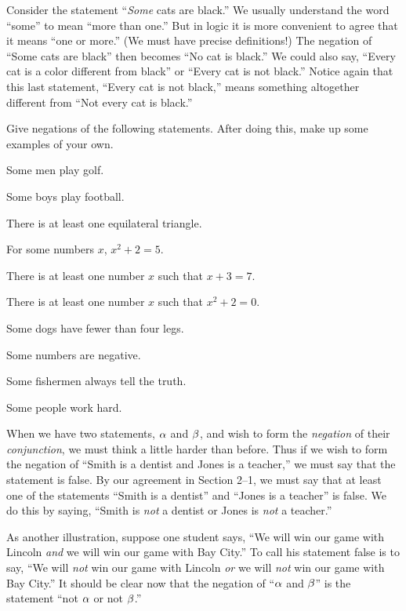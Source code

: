 \documentclass[11pt]{book}
\begin{document}
Consider the statement ``\emph{Some} cats are black.'' We usually understand the
word ``some'' to mean ``more than one.'' But in logic it is more convenient to
agree that it means ``one or more.'' (We must have precise definitions!) The
negation of ``Some cats are black'' then becomes ``No cat is black.'' We could
also say, ``Every cat is a color different from black'' or ``Every cat is not
black.'' Notice again that this last statement, ``Every cat is not black,'' means
something altogether different from ``Not every cat is black.''


Give negations of the following statements. After doing this, make up some
examples of your own.

\begin{exercisecols}
\begin{exlist}
\item Some men play golf.
\item Some boys play football.
\item There is at least one equilateral triangle.
\item For some numbers $x$, $x^2 + 2 = 5$.
\item There is at least one number $x$ such that $x + 3 = 7$.
\item There is at least one number $x$ such that $x^2 + 2 = 0$.
\item Some dogs have fewer than four legs.
\item[\stex 8.] Some numbers are negative.
\item[9.] Some fishermen always tell the truth.
\item[10.] Some people work hard.
\end{exlist}
\end{exercisecols}

When we have two statements, $\alpha$ and $\beta$, and wish to form the \emph{negation}
of their \emph{conjunction}, we must think a little harder than before. Thus if we
wish to form the negation of ``Smith is a dentist and Jones is a teacher,'' we
must say that the statement is false. By our agreement in Section 2--1, we must
say that at least one of the statements ``Smith is a dentist'' and ``Jones is a
teacher'' is false. We do this by saying, ``Smith is \emph{not} a dentist or Jones
is \emph{not} a teacher.''

As another illustration, suppose one student says, ``We will win our game with
Lincoln \emph{and} we will win our game with Bay City.'' To call his statement
false is to say, ``We will \emph{not} win our game with Lincoln \emph{or} we will
\emph{not} win our game with Bay City.'' It should be clear now that the negation
of ``$\alpha$ and $\beta$'' is the statement ``not $\alpha$ or not $\beta$.''
\end{document}

